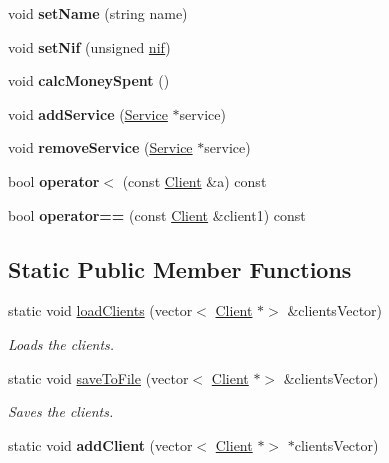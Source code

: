\begin{DoxyCompactItemize}
\item 
\mbox{\label{class_client_a1c7f938360e23b3e0e52d17965f88725}} 
void {\bfseries set\+Name} (string name)
\item 
\mbox{\label{class_client_a8d0ab1a3c654d361dacde7e1d2b92c94}} 
void {\bfseries set\+Nif} (unsigned \hyperlink{class_client_a1c94dc96a56cb5032573fb1d528517c2}{nif})
\item 
\mbox{\label{class_client_a65027bc2da365dfdbbf0393ee2697586}} 
void {\bfseries calc\+Money\+Spent} ()
\item 
\mbox{\label{class_client_abf36aa7168464608e917fa40f1ba52db}} 
void {\bfseries add\+Service} (\hyperlink{class_service}{Service} $\ast$service)
\item 
\mbox{\label{class_client_a018c06770de617bb404151e499206355}} 
void {\bfseries remove\+Service} (\hyperlink{class_service}{Service} $\ast$service)
\item 
\mbox{\label{class_client_a1cbbbf2ea0d65791314b7640c053197b}} 
bool {\bfseries operator$<$} (const \hyperlink{class_client}{Client} \&a) const
\item 
\mbox{\label{class_client_a5cc669077f776648216ae03461b8c178}} 
bool {\bfseries operator==} (const \hyperlink{class_client}{Client} \&client1) const
\end{DoxyCompactItemize}
\subsection*{Static Public Member Functions}
\begin{DoxyCompactItemize}
\item 
static void \hyperlink{class_client_ac18a40ed6975665b7f7661c8dcf7bf1b}{load\+Clients} (vector$<$ \hyperlink{class_client}{Client} $\ast$$>$ \&clients\+Vector)
\begin{DoxyCompactList}\small\item\em Loads the clients. \end{DoxyCompactList}\item 
static void \hyperlink{class_client_aceebaabb74ad1e3e5b30c168e5ef681b}{save\+To\+File} (vector$<$ \hyperlink{class_client}{Client} $\ast$$>$ \&clients\+Vector)
\begin{DoxyCompactList}\small\item\em Saves the clients. \end{DoxyCompactList}\item 
\mbox{\label{class_client_acd07078857cade36eee66b733de7bc38}} 
static void {\bfseries add\+Client} (vector$<$ \hyperlink{class_client}{Client} $\ast$$>$ $\ast$clients\+Vector)
\end{DoxyCompactItemize}
